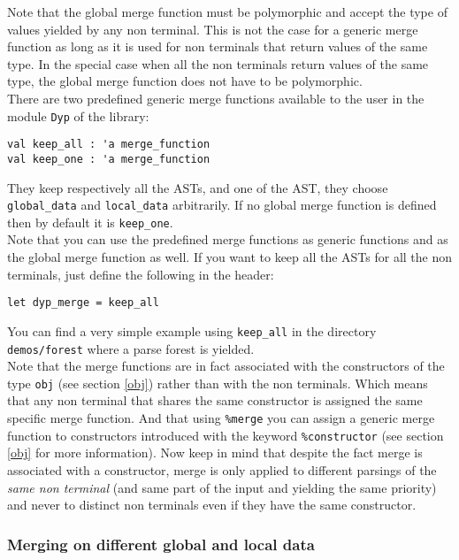 \documentclass[12pt]{article}
\begin{document}
{Note that the global merge function must be polymorphic and accept the type of values yielded by any non terminal. This is not the case for a generic merge function as long as it is used for non terminals that return values of the same type. In the special case when all the non terminals return values of the same type, the global merge function does not have to be polymorphic.\\

There are two predefined generic merge functions available to the user in the module \verb|Dyp| of the library:
\begin{verbatim}
val keep_all : 'a merge_function
val keep_one : 'a merge_function
\end{verbatim}
They keep respectively all the ASTs, and one of the AST, they choose \verb|global_data| and \verb|local_data| arbitrarily. If no global merge function is defined then by default it is \verb|keep_one|.\\

Note that you can use the predefined merge functions as generic functions and as the global merge function as well. If you want to keep all the ASTs for all the non terminals, just define the following in the header:
\begin{verbatim}
let dyp_merge = keep_all
\end{verbatim}

You can find a very simple example using \verb|keep_all| in the directory \texttt{demos/forest} where a parse forest is yielded.\\

Note that the merge functions are in fact associated with the constructors of the type \verb|obj| (see section \ref{obj}) rather than with the non terminals. Which means that any non terminal that shares the same constructor is assigned the same specific merge function. And that using \verb|%merge| you can assign a generic merge function to constructors introduced with the keyword \verb|%constructor| (see section \ref{obj} for more information). Now keep in mind that despite the fact merge is associated with a constructor, merge is only applied to different parsings of the \emph{same non terminal} (and same part of the input and yielding the same priority) and never to distinct non terminals even if they have the same constructor.

\subsubsection{Merging on different global and local data}\label{keep_data}

}
\end{document}
